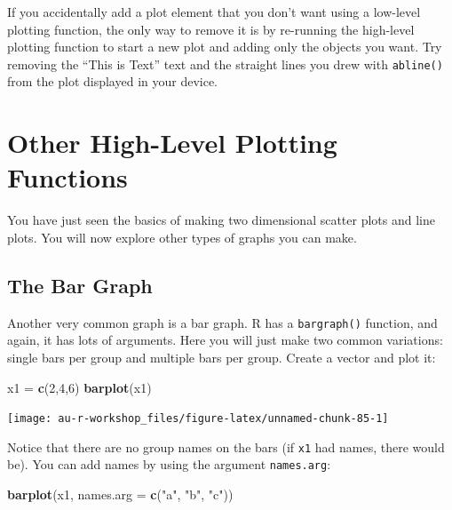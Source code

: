 \documentclass[]{book}
\newenvironment{Shaded}{\begin{snugshade}}{\end{snugshade}}
\newcommand{\KeywordTok}[1]{\textcolor[rgb]{0.13,0.29,0.53}{\textbf{#1}}}
\newcommand{\DataTypeTok}[1]{\textcolor[rgb]{0.13,0.29,0.53}{#1}}
\newcommand{\DecValTok}[1]{\textcolor[rgb]{0.00,0.00,0.81}{#1}}
\newcommand{\StringTok}[1]{\textcolor[rgb]{0.31,0.60,0.02}{#1}}
\newcommand{\NormalTok}[1]{#1}
\theoremstyle{definition}
\theoremstyle{definition}
\theoremstyle{definition}
\theoremstyle{remark}
\begin{document}
If you accidentally add a plot element that you don't want using a
low-level plotting function, the only way to remove it is by re-running
the high-level plotting function to start a new plot and adding only the
objects you want. Try removing the ``This is Text'' text and the
straight lines you drew with \texttt{abline()} from the plot displayed
in your device.

\section{Other High-Level Plotting
Functions}\label{other-high-level-plotting-functions}

You have just seen the basics of making two dimensional scatter plots
and line plots. You will now explore other types of graphs you can make.

\subsection{The Bar Graph}\label{the-bar-graph}

Another very common graph is a bar graph. R has a \texttt{bargraph()}
function, and again, it has lots of arguments. Here you will just make
two common variations: single bars per group and multiple bars per
group. Create a vector and plot it:

\begin{Shaded}
\begin{Highlighting}[]
\NormalTok{x1 =}\StringTok{ }\KeywordTok{c}\NormalTok{(}\DecValTok{2}\NormalTok{,}\DecValTok{4}\NormalTok{,}\DecValTok{6}\NormalTok{)}
\KeywordTok{barplot}\NormalTok{(x1)}
\end{Highlighting}
\end{Shaded}

\begin{center}\texttt{[image: au-r-workshop\_files/figure-latex/unnamed-chunk-85-1]} \end{center}

Notice that there are no group names on the bars (if \texttt{x1} had
names, there would be). You can add names by using the argument
\texttt{names.arg}:

\begin{Shaded}
\begin{Highlighting}[]
\KeywordTok{barplot}\NormalTok{(x1, }\DataTypeTok{names.arg =} \KeywordTok{c}\NormalTok{(}\StringTok{"a"}\NormalTok{, }\StringTok{"b"}\NormalTok{, }\StringTok{"c"}\NormalTok{))}
\end{Highlighting}
\end{Shaded}
\end{document}
